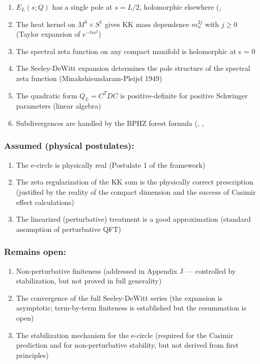 \documentclass[aps,prd,preprint,superscriptaddress,longbibliography,floatfix]{revtex4-2}
\theoremstyle{remark}
\begin{document}
\begin{enumerate}
  \item $E_L(s; Q)$ has a single pole at $s = L/2$, holomorphic elsewhere (\cite{Epstein1903}, \cite{Terras1985}
  \item The heat kernel on $M^{4} \times S^{1}$ gives KK mass dependence $m_n^{2j}$ with $j \geq 0$ (Taylor expansion of $e^{-tm^{2}}$)
  \item The spectral zeta function on any compact manifold is holomorphic at s = 0 \cite{Seeley1967}
  \item The Seeley-DeWitt expansion determines the pole structure of the spectral zeta function (Minakshisundaram-Pleijel 1949)
  \item The quadratic form $Q_L = C^T D C$ is positive-definite for positive Schwinger parameters (linear algebra)
  \item Subdivergences are handled by the BPHZ forest formula (\cite{Bogoliubov1957}, \cite{Hepp1966}, \cite{Zimmermann1969}
\end{enumerate}


\subsubsection{Assumed (physical postulates):}

\begin{enumerate}
  \item The e-circle is physically real (Postulate 1 of the framework)
  \item The zeta regularization of the KK sum is the physically correct prescription (justified by the reality of the compact dimension and the success of Casimir effect calculations)
  \item The linearized (perturbative) treatment is a good approximation (standard assumption of perturbative QFT)
\end{enumerate}


\subsubsection{Remains open:}

\begin{enumerate}
  \item Non-perturbative finiteness (addressed in Appendix J --- controlled by stabilization, but not proved in full generality)
  \item The convergence of the full Seeley-DeWitt series (the expansion is asymptotic; term-by-term finiteness is established but the resummation is open)
  \item The stabilization mechanism for the e-circle (required for the Casimir prediction and for non-perturbative stability, but not derived from first principles)
\end{enumerate}
\end{document}
